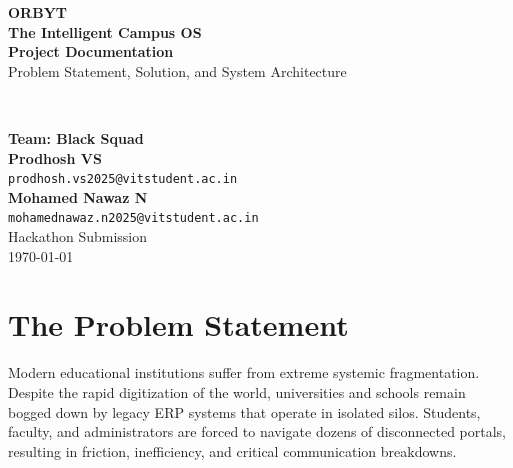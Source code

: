 \documentclass[11pt,a4paper]{article}
\begin{document}
\begin{titlepage}
    \centering
    \vspace*{4cm}
    
    {\Huge \textbf{\textcolor{OrbytBlue}{ORBYT}}}\\[0.5cm]
    {\LARGE \textbf{\textcolor{OrbytDark}{The Intelligent Campus OS}}}\\[1.5cm]
    
    {\large \textbf{Project Documentation}}\\[0.5cm]
    {\large Problem Statement, Solution, and System Architecture}\\[2cm]
    
    \\[2cm]
    
    \vfill
    
    {\Large \textbf{Team: Black Squad}}\\[0.6cm]
    
    {\textbf{Prodhosh VS} \\ \texttt{prodhosh.vs2025@vitstudent.ac.in}}\\[0.4cm]
    {\textbf{Mohamed Nawaz N} \\ \texttt{mohamednawaz.n2025@vitstudent.ac.in}}\\[1.5cm]
    
    {\large Hackathon Submission}\\[0.2cm]
    {\textcolor{OrbytGray}{\today}}
    
\end{titlepage}

\newpage

\tableofcontents
\newpage

\section{The Problem Statement}

Modern educational institutions suffer from extreme systemic fragmentation. Despite the rapid digitization of the world, universities and schools remain bogged down by legacy ERP systems that operate in isolated silos. Students, faculty, and administrators are forced to navigate dozens of disconnected portals, resulting in friction, inefficiency, and critical communication breakdowns.
\end{document}
